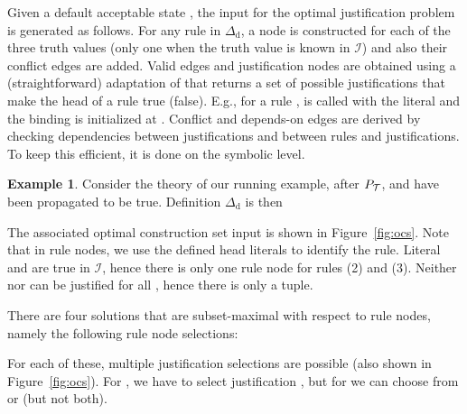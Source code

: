 \documentclass[11pt]{article}
\newcommand{\m}[1]{\ensuremath{#1}\xspace}
\newcommand{\I}{\m{\mathcal{I}}}
\newcommand{\theory}{\m{\mathcal{T}}}
\newcommand{\D}{\m{\Delta}}
\theoremstyle{plain}
\theoremstyle{definition}
\theoremstyle{example_basic}
\newtheorem{example}[thm]{Example}
\theoremstyle{example_contd}
\theoremstyle{plain}
\newcommand{\Dd}{\ensuremath{\D_\text{d}}\xspace}
\newcommand{\pt}{\ensuremath{P_\text{\theory}}\xspace}
\newcommand{\change}[1]{#1}
\begin{document}
Given a default acceptable state , the
input for the optimal justification problem is generated as
follows. For any rule in \Dd, a node is constructed for each of the
three truth values (only one when the truth value is known in \I) and
also their conflict edges are added. \change{ Valid edges and
  justification nodes} are obtained using a (straightforward) adaptation of \buildconstr \change{that} returns a set of possible justifications that make the head of a rule true (false). E.g., for a rule , \buildconstr is called with the literal  and the binding is initialized at . Conflict and depends-on edges are derived by checking dependencies between justifications and between rules and justifications. To keep this efficient, it is done on the symbolic level.

\begin{example}\label{ex:global}
Consider the theory of our running example, after \pt,  and  have been propagated to be true. Definition \Dd is then


The associated optimal construction set input is shown in
  Figure~\ref{fig:ocs}. \change{Note that in rule nodes, we use the defined head literals to identify the rule.} Literal  and  are true in \I, hence
  there is only one rule node for rules (2) and (3). Neither 
  nor  can be justified for all , hence
  \change{there is only a   tuple.}

  There are four solutions that are subset-maximal with respect to rule nodes, namely the following rule node selections:


For each of these, multiple justification selections are possible (also
shown in Figure~\ref{fig:ocs}). For , we have to select justification
, but for  we can choose from  or  (but not both).

\begin{figure}
\centering
{}
\end{figure}
\end{example}
\end{document}
